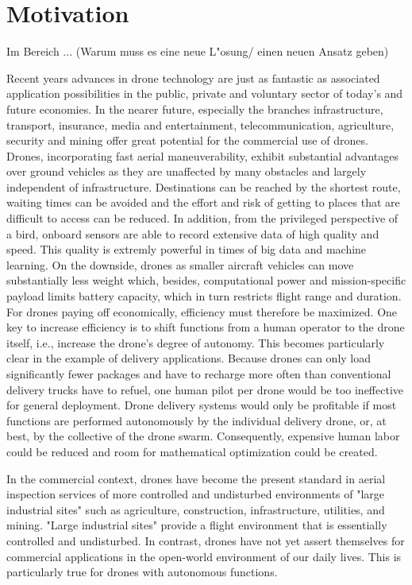 \chapter{Motivation}

{\color{cyan}Im Bereich ... (Warum muss es eine neue L"osung/ einen neuen Ansatz geben)}




Recent years advances in drone technology 
are just as fantastic as 
associated application possibilities in the 
public, private and voluntary sector of today's and future economies.
In the nearer future, especially the branches 
infrastructure, transport, insurance, media and entertainment, 
telecommunication, agriculture, security and mining 
offer great potential for the commercial use of drones. \cite{PwC2016}
Drones, incorporating fast aerial maneuverability,
exhibit substantial advantages over ground vehicles
as they are unaffected by many obstacles and largely independent of infrastructure.
Destinations can be reached by the shortest route, waiting times can be avoided
and the effort and risk of getting to places that are difficult to access can be reduced.
In addition, from the privileged perspective of a bird, onboard sensors 
are able to record extensive data 
of high quality and speed.
This quality is extremly powerful in times of big data and machine learning.
On the downside,
drones as smaller aircraft vehicles can move substantially less weight
which, besides, computational power and mission-specific payload 
limits battery capacity,
which in turn restricts flight range and duration.
For drones paying off economically, efficiency must therefore be maximized.
One key to increase efficiency is to shift functions from a human operator to the drone itself,
i.e., increase the drone's degree of autonomy.
This becomes particularly clear in the example of delivery applications.
Because drones can only load significantly fewer packages and
have to recharge more often than conventional delivery trucks have to refuel,
one human pilot per drone would be too ineffective for general deployment.
Drone delivery systems would only be profitable
if most functions are performed autonomously by the individual delivery drone,
or, at best, by the collective of the drone swarm.
Consequently, expensive human labor could be reduced
and room for mathematical optimization could be created.

In the commercial context,
drones have become the present standard
in aerial inspection services of
more controlled and undisturbed 
environments of "large industrial sites" such as
agriculture,
construction,
infrastructure,
utilities,
and mining.
"Large industrial sites" provide a flight environment
that is essentially controlled and undisturbed.
In contrast, drones
have not yet assert themselves for 
commercial applications in the open-world environment
of our daily lives.
This is particularly true for drones with
autonomous functions.


